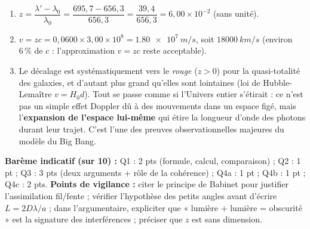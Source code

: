 \documentclass[11pt]{article}
\begin{document}
\begin{corrige}
\begin{enumerate}
\begin{enumerate}
        \item $z = \dfrac{\lambda' - \lambda_0}{\lambda_0} = \dfrac{695,7 - 656,3}{656,3} = \dfrac{39,4}{656,3} = \boxed{6,00\times10^{-2}}$ (sans unité).
        \item $v = zc = 0,0600 \times 3,00\times10^{8} = \boxed{\SI{1,80e7}{m/s}}$, soit $\SI{18000}{km/s}$ (environ $6\,\%$ de $c$ : l'approximation $v = zc$ reste acceptable).
        \item Le décalage est systématiquement vers le \emph{rouge} ($z > 0$) pour la quasi-totalité des galaxies, et d'autant plus grand qu'elles sont lointaines (loi de Hubble-Lemaître $v = H_0 d$). Tout se passe comme si l'Univers entier s'étirait : ce n'est pas un simple effet Doppler dû à des mouvements dans un espace figé, mais l'\textbf{expansion de l'espace lui-même} qui étire la longueur d'onde des photons durant leur trajet. C'est l'une des preuves observationnelles majeures du modèle du Big Bang.
    \end{enumerate}
\end{enumerate}
\textbf{Barème indicatif (sur 10) :} Q1 : 2 pts (formule, calcul, comparaison) ; Q2 : 1 pt ; Q3 : 3 pts (deux arguments + rôle de la cohérence) ; Q4a : 1 pt ; Q4b : 1 pt ; Q4c : 2 pts.
\textbf{Points de vigilance :} citer le principe de Babinet pour justifier l'assimilation fil/fente ; vérifier l'hypothèse des petits angles avant d'écrire $L = 2D\lambda/a$ ; dans l'argumentaire, expliciter que « lumière + lumière = obscurité » est la signature des interférences ; préciser que $z$ est sans dimension.
\end{corrige}
\end{document}
